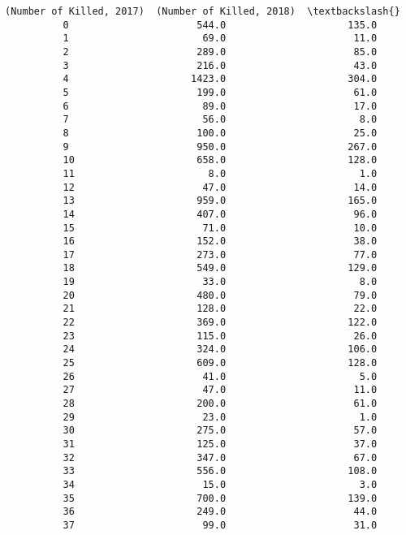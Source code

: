 \documentclass[11pt]{article}
\begin{document}
\begin{Verbatim}[commandchars=\\\{\}]
              (Number of Killed, 2017)  (Number of Killed, 2018)  \textbackslash{}
          0                      544.0                     135.0   
          1                       69.0                      11.0   
          2                      289.0                      85.0   
          3                      216.0                      43.0   
          4                     1423.0                     304.0   
          5                      199.0                      61.0   
          6                       89.0                      17.0   
          7                       56.0                       8.0   
          8                      100.0                      25.0   
          9                      950.0                     267.0   
          10                     658.0                     128.0   
          11                       8.0                       1.0   
          12                      47.0                      14.0   
          13                     959.0                     165.0   
          14                     407.0                      96.0   
          15                      71.0                      10.0   
          16                     152.0                      38.0   
          17                     273.0                      77.0   
          18                     549.0                     129.0   
          19                      33.0                       8.0   
          20                     480.0                      79.0   
          21                     128.0                      22.0   
          22                     369.0                     122.0   
          23                     115.0                      26.0   
          24                     324.0                     106.0   
          25                     609.0                     128.0   
          26                      41.0                       5.0   
          27                      47.0                      11.0   
          28                     200.0                      61.0   
          29                      23.0                       1.0   
          30                     275.0                      57.0   
          31                     125.0                      37.0   
          32                     347.0                      67.0   
          33                     556.0                     108.0   
          34                      15.0                       3.0   
          35                     700.0                     139.0   
          36                     249.0                      44.0   
          37                      99.0                      31.0   

\end{Verbatim}
\end{document}
